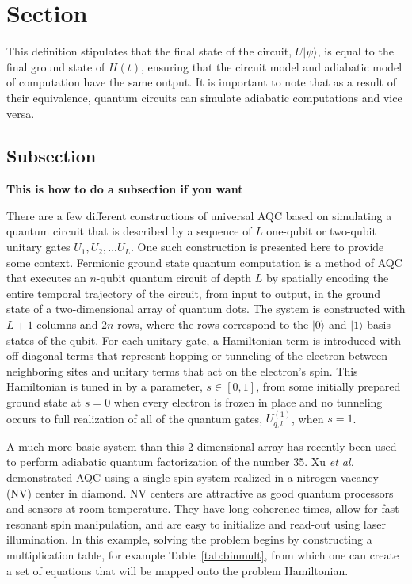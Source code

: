 \documentclass[%
 reprint,
 amsmath,amssymb,
 aps,
]{revtex4-1}
\begin{document}
   \section{Section}\label{sec:A}
   This definition stipulates that the final state of the circuit, $U\vert\psi\rangle$, is equal to the final ground state of $H(t)$, ensuring that the circuit model and adiabatic model of computation have the same output. It is important to note that as a result of their equivalence, quantum circuits can simulate adiabatic computations\cite{Farhi2000} and vice versa\cite{Aharanov2007}.
   
   \subsection{Subsection}
 	\textbf{This is how to do a subsection if you want}
   
   There are a few different constructions of universal AQC based on simulating a quantum circuit that is described by a sequence of $L$ one-qubit or two-qubit unitary gates $U_1 , U_2 , ... U_L$. One such construction is presented here to provide some context. Fermionic ground state quantum computation is a method of AQC that executes an $n$-qubit quantum circuit of depth $L$ by spatially encoding the entire temporal trajectory of the circuit, from input to output, in the ground state of a two-dimensional array of quantum dots\cite{Mizel2001}. The system is constructed with $L+1$ columns and $2n$ rows, where the rows correspond to the $\vert 0 \rangle$ and $\vert 1 \rangle$ basis states of the qubit. For each unitary gate, a Hamiltonian term is introduced with off-diagonal terms that represent hopping or tunneling of the electron between neighboring sites and unitary terms that act on the electron's spin. This Hamiltonian is tuned in by a parameter, $s \in [0,1]$, from some initially prepared ground state at $s=0$ when every electron is frozen in place and no tunneling occurs to full realization of all of the quantum gates, $U^{(1)}_{q,l}$, when $s=1$.
   
   A much more basic system than this 2-dimensional array has recently been used to perform adiabatic quantum factorization of the number 35\cite{Xu2017}. Xu \textit{et al.} demonstrated AQC using a single spin system realized in a nitrogen-vacancy (NV) center in diamond. NV centers are attractive as good quantum processors and sensors at room temperature\cite{DOHERTY20131}. They have long coherence times, allow for fast resonant spin manipulation, and are easy to initialize and read-out using laser illumination. In this example, solving the problem begins by constructing a multiplication table, for example Table~\ref{tab:binmult}, from which one can create a set of equations that will be mapped onto the problem Hamiltonian.
   
\end{document}
